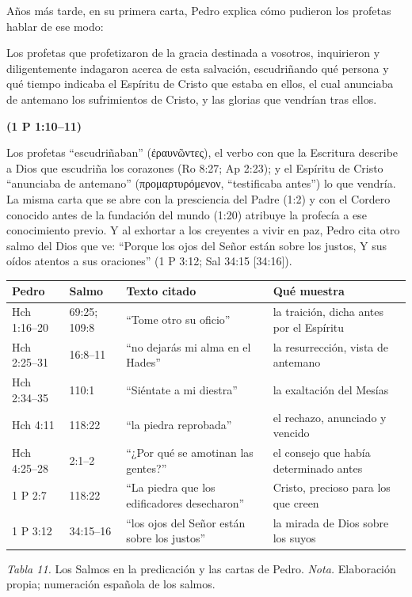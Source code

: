 \documentclass[11pt,letterpaper]{article}
\newcommand{\grc}[1]{\foreignlanguage{ancientgreek}{#1}}
\newcommand{\fuente}[1]{\par\hfill{\upshape\bfseries\small\textcolor{azul}{#1}}}
\begin{document}
Años más tarde, en su primera carta, Pedro explica cómo pudieron los profetas hablar de ese modo:

\begin{cita}Los profetas que profetizaron de la gracia destinada a vosotros, inquirieron y diligentemente indagaron acerca de esta salvación, escudriñando qué persona y qué tiempo indicaba el Espíritu de Cristo que estaba en ellos, el cual anunciaba de antemano los sufrimientos de Cristo, y las glorias que vendrían tras ellos.\fuente{(1 P 1:10--11)}\end{cita}

Los profetas ``escudriñaban'' (\grc{ἐραυνῶντες}), el verbo con que la Escritura describe a Dios que escudriña los corazones (Ro 8:27; Ap 2:23); y el Espíritu de Cristo ``anunciaba de antemano'' (\grc{προμαρτυρόμενον}, ``testificaba antes'') lo que vendría. La misma carta que se abre con la presciencia del Padre (1:2) y con el Cordero conocido antes de la fundación del mundo (1:20) atribuye la profecía a ese conocimiento previo. Y al exhortar a los creyentes a vivir en paz, Pedro cita otro salmo del Dios que ve: ``Porque los ojos del Señor están sobre los justos, Y sus oídos atentos a sus oraciones'' (1 P 3:12; Sal 34:15 [34:16]).

\begin{center}\small\renewcommand{\arraystretch}{1.2}
\begin{tabular}{@{}L{2.4cm}L{2.6cm}L{4.6cm}L{4.8cm}@{}}
\toprule
\textbf{Pedro} & \textbf{Salmo} & \textbf{Texto citado} & \textbf{Qué muestra} \\ \midrule
Hch 1:16--20 & 69:25; 109:8 & ``Tome otro su oficio'' & la traición, dicha antes por el Espíritu \\
Hch 2:25--31 & 16:8--11 & ``no dejarás mi alma en el Hades'' & la resurrección, vista de antemano \\
Hch 2:34--35 & 110:1 & ``Siéntate a mi diestra'' & la exaltación del Mesías \\
Hch 4:11 & 118:22 & ``la piedra reprobada'' & el rechazo, anunciado y vencido \\
Hch 4:25--28 & 2:1--2 & ``¿Por qué se amotinan las gentes?'' & el consejo que había determinado antes \\
1 P 2:7 & 118:22 & ``La piedra que los edificadores desecharon'' & Cristo, precioso para los que creen \\
1 P 3:12 & 34:15--16 & ``los ojos del Señor están sobre los justos'' & la mirada de Dios sobre los suyos \\
\bottomrule
\end{tabular}\par
{\footnotesize\color{gris}\textit{Tabla 11.} Los Salmos en la predicación y las cartas de Pedro. \textit{Nota.} Elaboración propia; numeración española de los salmos.}
\end{center}
\end{document}
